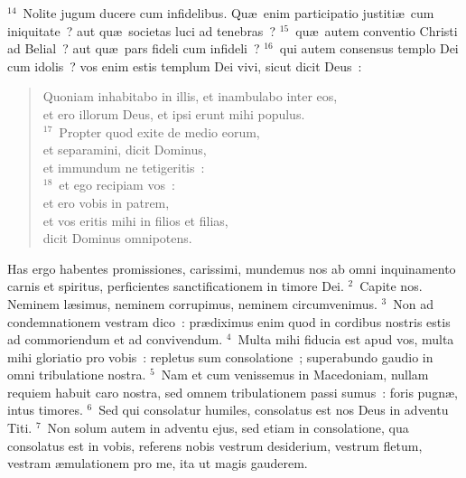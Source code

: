 ${}^{14}$~Nolite jugum ducere cum infidelibus. Qu\ae\ enim participatio justiti\ae\ cum iniquitate~? aut qu\ae\ societas luci ad tenebras~?
${}^{15}$~qu\ae\ autem conventio Christi ad Belial~? aut qu\ae\ pars fideli cum infideli~?
${}^{16}$~qui autem consensus templo Dei cum idolis~? vos enim estis templum Dei vivi, sicut dicit Deus~: \begin{flushleft}\begin{verse}Quoniam inhabitabo in illis, et inambulabo inter eos,\\ et ero illorum Deus, et ipsi erunt mihi populus.\\
${}^{17}$~Propter quod exite de medio eorum,\\ et separamini, dicit Dominus,\\ et immundum ne tetigeritis~:\\
${}^{18}$~et ego recipiam vos~:\\ et ero vobis in patrem,\\ et vos eritis mihi in filios et filias,\\ dicit Dominus omnipotens.\end{verse}\end{flushleft}



\lettrine[lines=3,image=true,loversize=0.05,lraise=-0.03]{H}{}as ergo habentes promissiones, carissimi, mundemus nos ab omni inquinamento carnis et spiritus, perficientes sanctificationem in timore Dei.
${}^{2}$~Capite nos. Neminem l\ae simus, neminem corrupimus, neminem circumvenimus.
${}^{3}$~Non ad condemnationem vestram dico~: pr\ae diximus enim quod in cordibus nostris estis ad commoriendum et ad convivendum.
${}^{4}$~Multa mihi fiducia est apud vos, multa mihi gloriatio pro vobis~: repletus sum consolatione~; superabundo gaudio in omni tribulatione nostra.
${}^{5}$~Nam et cum venissemus in Macedoniam, nullam requiem habuit caro nostra, sed omnem tribulationem passi sumus~: foris pugn\ae , intus timores.
${}^{6}$~Sed qui consolatur humiles, consolatus est nos Deus in adventu Titi.
${}^{7}$~Non solum autem in adventu ejus, sed etiam in consolatione, qua consolatus est in vobis, referens nobis vestrum desiderium, vestrum fletum, vestram \ae mulationem pro me, ita ut magis gauderem.



